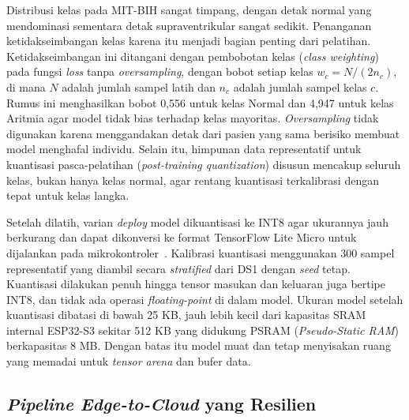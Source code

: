 Distribusi kelas pada MIT-BIH sangat timpang, dengan detak normal yang mendominasi
sementara detak supraventrikular sangat sedikit. Penanganan ketidakseimbangan kelas
karena itu menjadi bagian penting dari pelatihan. Ketidakseimbangan ini ditangani dengan pembobotan
kelas (\emph{class weighting}) pada fungsi \emph{loss} tanpa \emph{oversampling},
dengan bobot setiap kelas $w_c = N/(2 n_c)$, di mana $N$ adalah jumlah sampel latih dan
$n_c$ adalah jumlah sampel kelas $c$. Rumus ini menghasilkan bobot 0,556 untuk kelas
Normal dan 4,947 untuk kelas Aritmia agar model tidak bias terhadap kelas mayoritas.
\emph{Oversampling} tidak digunakan karena menggandakan detak dari pasien yang sama
berisiko membuat model menghafal individu. Selain itu, himpunan
data representatif untuk kuantisasi pasca-pelatihan (\emph{post-training quantization})
disusun mencakup seluruh kelas, bukan hanya kelas normal, agar rentang
kuantisasi terkalibrasi dengan tepat untuk kelas langka.

Setelah dilatih, varian \textit{deploy} model dikuantisasi ke INT8 agar ukurannya jauh berkurang dan dapat dikonversi ke format TensorFlow Lite Micro untuk dijalankan pada mikrokontroler~\cite{jacob_2018, david_2021}. Kalibrasi kuantisasi menggunakan 300 sampel representatif yang diambil secara \textit{stratified} dari DS1 dengan \textit{seed} tetap. Kuantisasi dilakukan penuh hingga tensor masukan dan keluaran juga bertipe INT8, dan tidak ada operasi \textit{floating-point} di dalam model. Ukuran model setelah kuantisasi dibatasi di bawah 25 KB, jauh lebih kecil dari kapasitas SRAM internal ESP32-S3 sekitar 512 KB yang didukung PSRAM (\textit{Pseudo-Static RAM}) berkapasitas 8 MB. Dengan batas itu model muat dan tetap menyisakan ruang yang memadai untuk \textit{tensor arena} dan bufer data.

\subsection{\textit{Pipeline Edge-to-Cloud} yang Resilien}

